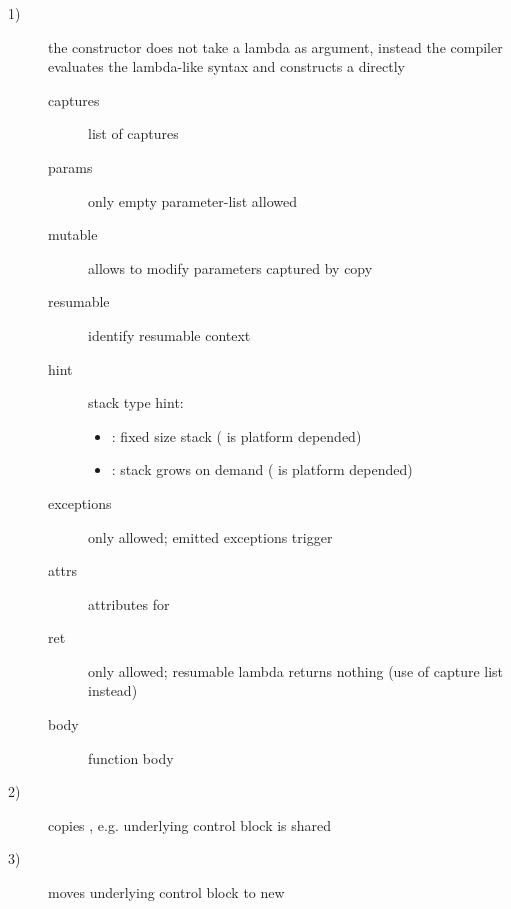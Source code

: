 \begin{description}
    \item[1)] the constructor does not take a lambda as argument, instead the
              compiler evaluates the lambda-like syntax and constructs a \ectx
              directly
              \begin{description}
                  \item[captures]     list of captures
                  \item[params]       only empty parameter-list allowed
                  \item[mutable]      allows to modify parameters captured by copy
                  \item[resumable]    identify resumable context
                  \item[hint]         stack type hint:
                                      \begin{itemize}
                                          \item {}:
                                              fixed size stack ( is
                                              platform depended)
                                          \item {}:
                                              stack grows on demand (
                                              is platform depended)
                                      \end{itemize}
                  \item[exceptions]   only  allowed; emitted exceptions
                                      trigger 
                  \item[attrs]        attributes for 
                  \item[ret]          only  allowed; resumable lambda returns nothing
                                      (use of capture list instead)
                  \item[body]         function body\\
              \end{description}
    \item[2)] copies \ectx, e.g. underlying control block is shared
    \item[3)] moves underlying control block to new \ectx
\end{description}

